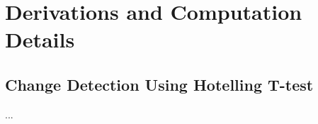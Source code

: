 \chapter{Derivations and Computation Details}
\label{cha:derivations}

\section{Change Detection Using Hotelling T-test}
\label{sec:hotelling}

...